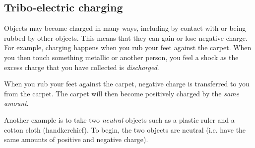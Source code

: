             \subsection{Tribo-electric charging}
            \nopagebreak
            \label{m38780*id200729}Objects may become charged in many ways, including by contact with or being rubbed by other objects. This means that they can gain or lose negative charge. For example, charging happens
when you rub your feet against the carpet. When you
then touch something metallic or another person, you feel a shock as
the excess charge that you have collected is \textsl{discharged}.\par 
{}
\label{m38780*id200752}When you rub your feet
against the carpet, negative charge is transferred to you
from the carpet. The carpet will then become positively
charged by the \textsl{same amount}.\par 
      \label{m38780*id200762}Another example is to take two \textsl{neutral} objects such as a plastic ruler and a cotton cloth (handkerchief). To begin, the two objects are neutral (i.e. have the same amounts of positive and negative charge).\par 
      \label{m38780*id200774}
    \setcounter{subfigure}{0}
